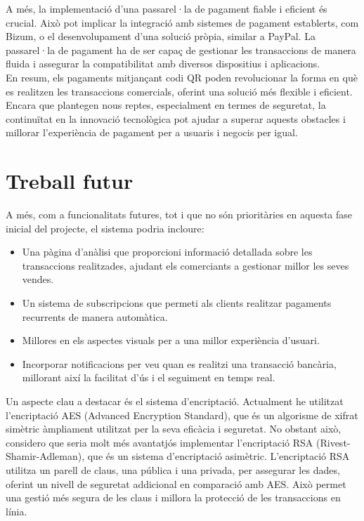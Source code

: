 \documentclass[a4paper,12pt,twoside]{ThesisStyle}
\begin{document}
A més, la implementació d'una passarel·la de pagament fiable i eficient és crucial. Això pot implicar la integració amb sistemes de pagament establerts, com Bizum, o el desenvolupament d'una solució pròpia, similar a PayPal. La passarel·la de pagament ha de ser capaç de gestionar les transaccions de manera fluida i assegurar la compatibilitat amb diversos dispositius i aplicacions.\\


En resum, els pagaments mitjançant codi QR poden revolucionar la forma en què es realitzen les transaccions comercials, oferint una solució més flexible i eficient. Encara que plantegen nous reptes, especialment en termes de seguretat, la continuïtat en la innovació tecnològica pot ajudar a superar aquests obstacles i millorar l'experiència de pagament per a usuaris i negocis per igual.\\




\chapter{Treball futur}
\label{chp:treballfutur}

A més, com a funcionalitats futures, tot i que no són prioritàries en aquesta fase inicial del projecte, el sistema podria incloure:

\begin{itemize}
\item Una pàgina d'anàlisi que proporcioni informació detallada sobre les transaccions realitzades, ajudant els comerciants a gestionar millor les seves vendes.
\item Un sistema de subscripcions que permeti als clients realitzar pagaments recurrents de manera automàtica.
\item Millores en els aspectes visuals per a una millor experiència d'usuari.
\item Incorporar notificacions per veu quan es realitzi una transacció bancària, millorant així la facilitat d'ús i el seguiment en temps real.
\end{itemize}

Un aspecte clau a destacar és el sistema d'encriptació. Actualment he utilitzat l'encriptació AES (Advanced Encryption Standard), que és un algorisme de xifrat simètric àmpliament utilitzat per la seva eficàcia i seguretat. No obstant això, considero que seria molt més avantatjós implementar l'encriptació RSA (Rivest-Shamir-Adleman), que és un sistema d'encriptació asimètric. L'encriptació RSA utilitza un parell de claus, una pública i una privada, per assegurar les dades, oferint un nivell de seguretat addicional en comparació amb AES. Això permet una gestió més segura de les claus i millora la protecció de les transaccions en línia.
\end{document}
